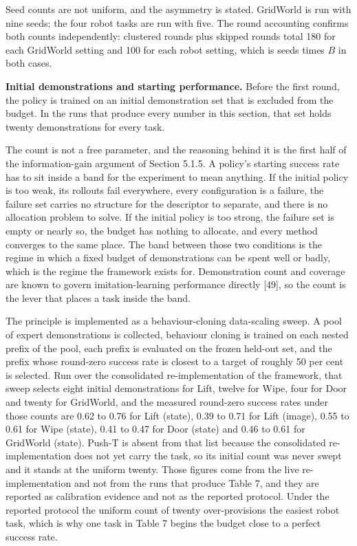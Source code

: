 \documentclass[
  11pt,
]{article}
\begin{document}
Seed counts are not uniform, and the asymmetry is stated. GridWorld is
run with nine seeds; the four robot tasks are run with five. The round
accounting confirms both counts independently: clustered rounds plus
skipped rounds total 180 for each GridWorld setting and 100 for each
robot setting, which is seeds times \(B\) in both cases.

\textbf{Initial demonstrations and starting performance.} Before the
first round, the policy is trained on an initial demonstration set that
is excluded from the budget. In the runs that produce every number in
this section, that set holds twenty demonstrations for every task.

The count is not a free parameter, and the reasoning behind it is the
first half of the information-gain argument of Section 5.1.5. A policy's
starting success rate has to sit inside a band for the experiment to
mean anything. If the initial policy is too weak, its rollouts fail
everywhere, every configuration is a failure, the failure set carries no
structure for the descriptor to separate, and there is no allocation
problem to solve. If the initial policy is too strong, the failure set
is empty or nearly so, the budget has nothing to allocate, and every
method converges to the same place. The band between those two
conditions is the regime in which a fixed budget of demonstrations can
be spent well or badly, which is the regime the framework exists for.
Demonstration count and coverage are known to govern imitation-learning
performance directly {[}49{]}, so the count is the lever that places a
task inside the band.

The principle is implemented as a behaviour-cloning data-scaling sweep.
A pool of expert demonstrations is collected, behaviour cloning is
trained on each nested prefix of the pool, each prefix is evaluated on
the frozen held-out set, and the prefix whose round-zero success rate is
closest to a target of roughly 50 per cent is selected. Run over the
consolidated re-implementation of the framework, that sweep selects
eight initial demonstrations for Lift, twelve for Wipe, four for Door
and twenty for GridWorld, and the measured round-zero success rates
under those counts are 0.62 to 0.76 for Lift (state), 0.39 to 0.71 for
Lift (image), 0.55 to 0.61 for Wipe (state), 0.41 to 0.47 for Door
(state) and 0.46 to 0.61 for GridWorld (state). Push-T is absent from
that list because the consolidated re-implementation does not yet carry
the task, so its initial count was never swept and it stands at the
uniform twenty. Those figures come from the live re-implementation and
not from the runs that produce Table 7, and they are reported as
calibration evidence and not as the reported protocol. Under the
reported protocol the uniform count of twenty over-provisions the
easiest robot task, which is why one task in Table 7 begins the budget
close to a perfect success rate.
\end{document}
